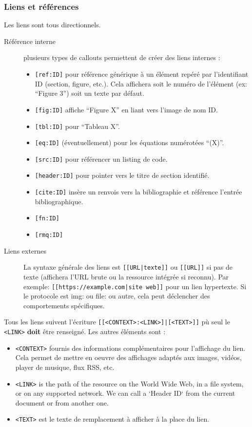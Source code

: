 \documentclass[a4paper,12pt]{article}
\newcounter{rmq}
\begin{document}
\subsubsection{Liens et références}
\label{sec:org6315060}
Les liens sont tous directionnels. 
\begin{description}
\item[{Référence interne}] plusieurs types de callouts permettent de créer des liens internes :
\begin{itemize}
\item \texttt{[ref:ID]} pour référence générique à un élément repéré par l’identifiant ID (section, figure, etc.). Cela affichera soit le numéro de l’élément (ex: “Figure 3”) soit un texte par défaut.
\item \texttt{[fig:ID]} affiche “Figure X” en liant vers l’image de nom ID.
\item \texttt{[tbl:ID]} pour “Tableau X”.
\item \texttt{[eq:ID]} (éventuellement) pour les équations numérotées “(X)”.
\item \texttt{[src:ID]} pour référencer un listing de code.
\item \texttt{[header:ID]} pour pointer vers le titre de section identifié.
\item \texttt{[cite:ID]} insère un renvois vers la bibliographie et référence l'entrée bibliographique.
\item \texttt{[fn:ID]}
\item \texttt{[rmq:ID]}
\end{itemize}

\item[{Liens externes}] La syntaxe générale des liens est \texttt{[[URL|texte]]} ou \texttt{[[URL]]} si pas de texte (affichera l’URL brute ou la ressource intégrée si reconnu). Par exemple: \texttt{[[https://example.com|site web]]} pour un lien hypertexte. Si le protocole est img: ou file: ou autre, cela peut déclencher des comportements spécifiques.
\end{description}

Tous les liens suivent l'écriture \texttt{[[<CONTEXT>:<LINK>]|[<TEXT>]]} pù seul le \texttt{<LINK>} \textbf{doit} être renseigné. Les autres éléments sont : 
\begin{itemize}
\item \texttt{<CONTEXT>} fournis des informations complémentaires pour l'affichage du lien. Cela permet de mettre en oeuvre des affichages adaptés aux images, vidéos, player de musique, flux RSS, etc.
\item \texttt{<LINK>} is the path of the resource on the World Wide Web, in a file system, or on any supported network. We can call a `Header ID` from the current document or from another one.
\item \texttt{<TEXT>} est le texte de remplacement à afficher à la place du lien.
\end{itemize}
\end{document}

